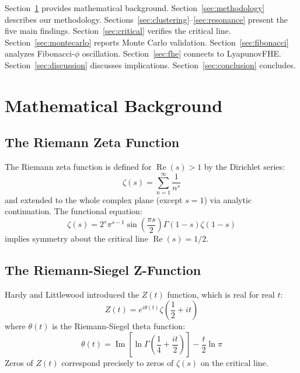 \documentclass[11pt,a4paper]{article}
\DeclareMathOperator{\Rea}{Re}
\DeclareMathOperator{\Ima}{Im}
\begin{document}
Section~\ref{sec:background} provides mathematical background. Section~\ref{sec:methodology} describes our methodology. Sections~\ref{sec:clustering}--\ref{sec:resonance} present the five main findings. Section~\ref{sec:critical} verifies the critical line. Section~\ref{sec:montecarlo} reports Monte Carlo validation. Section~\ref{sec:fibonacci} analyzes Fibonacci-$\phi$ oscillation. Section~\ref{sec:fhe} connects to LyapunovFHE. Section~\ref{sec:discussion} discusses implications. Section~\ref{sec:conclusion} concludes.

\newpage

\section{Mathematical Background}
\label{sec:background}

\subsection{The Riemann Zeta Function}

The Riemann zeta function is defined for $\Rea(s) > 1$ by the Dirichlet series:
\begin{equation}
\zeta(s) = \sum_{n=1}^{\infty} \frac{1}{n^s}
\end{equation}
and extended to the whole complex plane (except $s=1$) via analytic continuation. The functional equation:
\begin{equation}
\zeta(s) = 2^s \pi^{s-1} \sin\left(\frac{\pi s}{2}\right) \Gamma(1-s) \zeta(1-s)
\end{equation}
implies symmetry about the critical line $\Rea(s) = 1/2$.

\subsection{The Riemann-Siegel Z-Function}

Hardy and Littlewood introduced the $Z(t)$ function, which is real for real $t$:
\begin{equation}
Z(t) = e^{i\theta(t)} \zeta\left(\frac{1}{2} + it\right)
\end{equation}
where $\theta(t)$ is the Riemann-Siegel theta function:
\begin{equation}
\theta(t) = \Ima\left[\ln\Gamma\left(\frac{1}{4} + \frac{it}{2}\right)\right] - \frac{t}{2}\ln\pi
\end{equation}
Zeros of $Z(t)$ correspond precisely to zeros of $\zeta(s)$ on the critical line.
\end{document}
